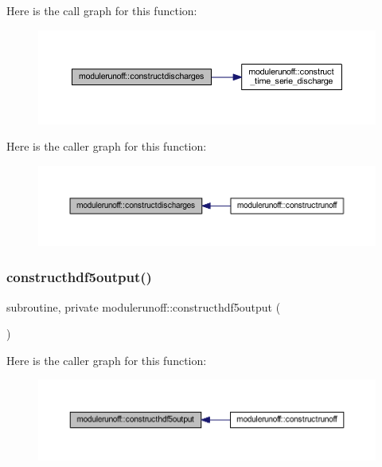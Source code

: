 Here is the call graph for this function\+:\nopagebreak
\begin{figure}[H]
\begin{center}
\leavevmode
\includegraphics[width=350pt]{namespacemodulerunoff_aaa760a0a33dfff4681a831fe25d1b075_cgraph}
\end{center}
\end{figure}
Here is the caller graph for this function\+:\nopagebreak
\begin{figure}[H]
\begin{center}
\leavevmode
\includegraphics[width=350pt]{namespacemodulerunoff_aaa760a0a33dfff4681a831fe25d1b075_icgraph}
\end{center}
\end{figure}
\mbox{\label{namespacemodulerunoff_a2cafb8c9efc342200a6ec558a7eeb90d}} 
\subsubsection{\texorpdfstring{constructhdf5output()}{constructhdf5output()}}
{\footnotesize\ttfamily subroutine, private modulerunoff\+::constructhdf5output (\begin{DoxyParamCaption}{ }\end{DoxyParamCaption})\hspace{0.3cm}{\ttfamily [private]}}

Here is the caller graph for this function\+:\nopagebreak
\begin{figure}[H]
\begin{center}
\leavevmode
\includegraphics[width=350pt]{namespacemodulerunoff_a2cafb8c9efc342200a6ec558a7eeb90d_icgraph}
\end{center}
\end{figure}
\mbox{\label{namespacemodulerunoff_a9750562ffa96a2b097ee6cfb440440ec}} 
